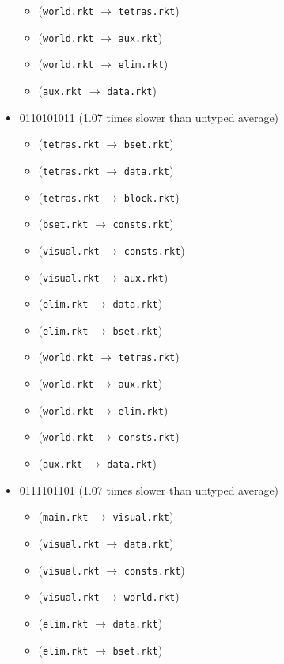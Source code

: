 \documentclass{article}
\newcommand{\mono}[1]{\texttt{#1}}
\begin{document}
\begin{itemize}
\begin{itemize}
  \item (\mono{world.rkt} $\rightarrow$ \mono{tetras.rkt})
  \item (\mono{world.rkt} $\rightarrow$ \mono{aux.rkt})
  \item (\mono{world.rkt} $\rightarrow$ \mono{elim.rkt})
  \item (\mono{aux.rkt} $\rightarrow$ \mono{data.rkt})
  \end{itemize}
\item 0110101011 (1.07 times slower than untyped average)
  \begin{itemize}
  \item (\mono{tetras.rkt} $\rightarrow$ \mono{bset.rkt})
  \item (\mono{tetras.rkt} $\rightarrow$ \mono{data.rkt})
  \item (\mono{tetras.rkt} $\rightarrow$ \mono{block.rkt})
  \item (\mono{bset.rkt} $\rightarrow$ \mono{consts.rkt})
  \item (\mono{visual.rkt} $\rightarrow$ \mono{consts.rkt})
  \item (\mono{visual.rkt} $\rightarrow$ \mono{aux.rkt})
  \item (\mono{elim.rkt} $\rightarrow$ \mono{data.rkt})
  \item (\mono{elim.rkt} $\rightarrow$ \mono{bset.rkt})
  \item (\mono{world.rkt} $\rightarrow$ \mono{tetras.rkt})
  \item (\mono{world.rkt} $\rightarrow$ \mono{aux.rkt})
  \item (\mono{world.rkt} $\rightarrow$ \mono{elim.rkt})
  \item (\mono{world.rkt} $\rightarrow$ \mono{consts.rkt})
  \item (\mono{aux.rkt} $\rightarrow$ \mono{data.rkt})
  \end{itemize}
\item 0111101101 (1.07 times slower than untyped average)
  \begin{itemize}
  \item (\mono{main.rkt} $\rightarrow$ \mono{visual.rkt})
  \item (\mono{visual.rkt} $\rightarrow$ \mono{data.rkt})
  \item (\mono{visual.rkt} $\rightarrow$ \mono{consts.rkt})
  \item (\mono{visual.rkt} $\rightarrow$ \mono{world.rkt})
  \item (\mono{elim.rkt} $\rightarrow$ \mono{data.rkt})
  \item (\mono{elim.rkt} $\rightarrow$ \mono{bset.rkt})

\end{itemize}
\end{itemize}
\end{document}
